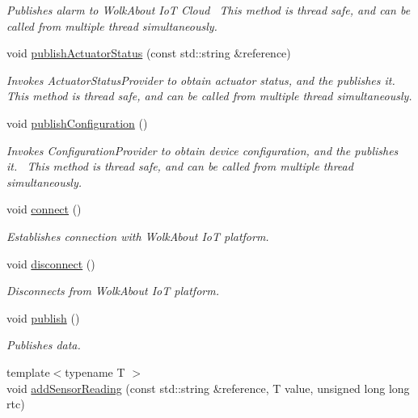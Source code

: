 \begin{DoxyCompactItemize}
\begin{DoxyCompactList}\small\item\em Publishes alarm to Wolk\+About IoT Cloud~\newline
 This method is thread safe, and can be called from multiple thread simultaneously. \end{DoxyCompactList}\item 
void \hyperlink{classwolkabout_1_1_wolk_a44615f58380fb36be1f2c21c5423469a}{publish\+Actuator\+Status} (const std\+::string \&reference)
\begin{DoxyCompactList}\small\item\em Invokes Actuator\+Status\+Provider to obtain actuator status, and the publishes it.~\newline
 This method is thread safe, and can be called from multiple thread simultaneously. \end{DoxyCompactList}\item 
void \hyperlink{classwolkabout_1_1_wolk_a07c1144ebaf09975fa8e9d2cdc908fe5}{publish\+Configuration} ()
\begin{DoxyCompactList}\small\item\em Invokes Configuration\+Provider to obtain device configuration, and the publishes it.~\newline
 This method is thread safe, and can be called from multiple thread simultaneously. \end{DoxyCompactList}\item 
void \hyperlink{classwolkabout_1_1_wolk_ae78f0c33b71e8d33861de8547de1c311}{connect} ()
\begin{DoxyCompactList}\small\item\em Establishes connection with Wolk\+About IoT platform. \end{DoxyCompactList}\item 
void \hyperlink{classwolkabout_1_1_wolk_a805c8f842b1e4a480ac1a8bc1b6add06}{disconnect} ()
\begin{DoxyCompactList}\small\item\em Disconnects from Wolk\+About IoT platform. \end{DoxyCompactList}\item 
void \hyperlink{classwolkabout_1_1_wolk_a692525b11e983643eb12b2bdfc54d4cd}{publish} ()
\begin{DoxyCompactList}\small\item\em Publishes data. \end{DoxyCompactList}\item 
{\footnotesize template$<$typename T $>$ }\\void \hyperlink{classwolkabout_1_1_wolk_a882dcff4a9d9d51fd9d0e76edfd03d9e}{add\+Sensor\+Reading} (const std\+::string \&reference, T value, unsigned long long rtc)

\end{DoxyCompactItemize}

